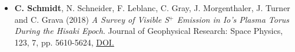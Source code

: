 \documentclass[12pt]{report}
\begin{document}
\begin{itemize}
  \item \textbf{C. Schmidt}, N. Schneider, F. Leblanc, C. Gray, J. Morgenthaler, J. Turner and C. Grava (2018) \textit{A Survey of Visible S$^+$ Emission in Io's Plasma Torus During the Hisaki Epoch}. Journal of Geophysical Research: Space Physics, 123, 7, pp. 5610-5624, \href{https://doi.org/10.1029/2018JA025296}{DOI.}

\end{itemize}
\end{document}
